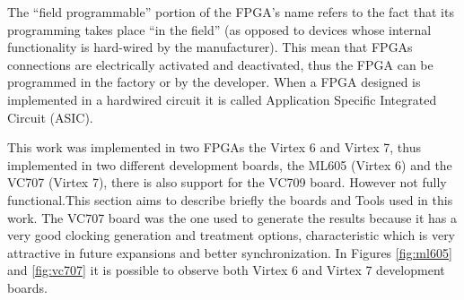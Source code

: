 The “field programmable” portion of the FPGA’s name refers to the fact that its
programming takes place “in the field” (as opposed to devices whose internal
functionality is hard-wired by the manufacturer). This mean that FPGAs
connections are electrically activated and deactivated, thus the FPGA can be
programmed in the factory or by the developer. When a  FPGA designed is
implemented in a hardwired circuit it is called Application Specific
Integrated Circuit (ASIC).


This work was implemented in two FPGAs the Virtex 6 and Virtex 7, thus
implemented in two different development boards, the ML605 (Virtex 6) and the
VC707 (Virtex 7), there is also support for the VC709 board. However not fully
functional.This section aims to describe briefly the boards and Tools used in
this work. The VC707 board was the one used to generate the results because it
has a very good clocking generation and treatment options, characteristic which
is very attractive in future expansions and better synchronization. In Figures
\ref{fig:ml605} and \ref{fig:vc707} it is possible to observe both Virtex 6 and
Virtex 7 development boards.



%


